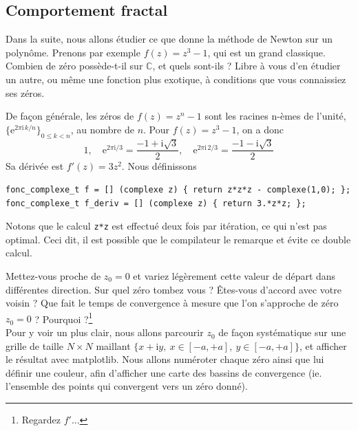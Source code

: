\documentclass{book}
\newcommand{\inline}[1]{\texttt{#1}}
\begin{document}

\subsection{Comportement fractal}

Dans la suite, nous allons étudier ce que donne la méthode de Newton sur un polynôme. Prenons par exemple $f(z)=z^3-1$, qui est un grand classique. Combien de zéro possède-t-il sur $\mathbb{C}$, et quels sont-ils ? Libre à vous d'en étudier un autre, ou même une fonction plus exotique, à conditions que vous connaissiez ses zéros.\\

\begin{correction}
De façon générale, les zéros de $f(z)=z^n-1$ sont les racines n-èmes de l'unité, $\{ \mathrm{e}^{2\pi \mathrm{i}\,k/n} \}_{0\leq k < n}$, au nombre de $n$. Pour $f(z)=z^3-1$, on a donc
  \begin{equation*}
  1,\quad \mathrm{e}^{2\pi \mathrm{i}/3}=\frac{-1+\mathrm{i}\sqrt{3}}{2},\quad \mathrm{e}^{2\pi \mathrm{i}\,2/3}=\frac{-1-\mathrm{i}\sqrt{3}}{2}
  \end{equation*}
Sa dérivée est $f'(z)=3 z^2$. Nous définissons
\begin{verbatim}
fonc_complexe_t f = [] (complexe z) { return z*z*z - complexe(1,0); };
fonc_complexe_t f_deriv = [] (complexe z) { return 3.*z*z; };
\end{verbatim}
Notons que le calcul \inline{z*z} est effectué deux fois par itération, ce qui n'est pas optimal. Ceci dit, il est possible que le compilateur le remarque et évite ce double calcul.
\end{correction}

Mettez-vous proche de $z_0=0$ et variez légèrement cette valeur de départ dans différentes direction. Sur quel zéro tombez vous ? Êtes-vous d'accord avec votre voisin ? Que fait le temps de convergence à mesure que l'on s'approche de zéro $z_0=0$ ? Pourquoi ?\footnote{Regardez $f'$...}\\

Pour y voir un plus clair, nous allons parcourir $z_0$ de façon systématique sur une grille de taille $N\times N$ maillant $\{x+\mathrm{i}y,\ x\in[-a,+a],\ y\in[-a,+a]\}$, et afficher le résultat avec matplotlib. Nous allons numéroter chaque zéro ainsi que lui définir une couleur, afin d'afficher une carte des bassins de convergence (ie. l'ensemble des points qui convergent vers un zéro donné).\\
\end{document}
